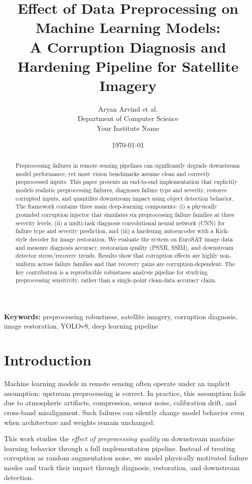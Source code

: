 \documentclass[11pt]{article}
\title{Effect of Data Preprocessing on Machine Learning Models:\\
A Corruption Diagnosis and Hardening Pipeline for Satellite Imagery}
\author{Aryan Arvind et al.\\
Department of Computer Science\\
Your Institute Name}
\date{\today}
\begin{document}
\maketitle

\begin{abstract}
Preprocessing failures in remote sensing pipelines can significantly degrade downstream model performance, yet most vision benchmarks assume clean and correctly preprocessed inputs. This paper presents an end-to-end implementation that explicitly models realistic preprocessing failures, diagnoses failure type and severity, restores corrupted inputs, and quantifies downstream impact using object detection behavior. The framework contains three main deep-learning components: (i) a physically grounded corruption injector that simulates six preprocessing failure families at three severity levels, (ii) a multi-task diagnosis convolutional neural network (CNN) for failure type and severity prediction, and (iii) a hardening autoencoder with a Kick-style decoder for image restoration. We evaluate the system on EuroSAT image data and measure diagnosis accuracy, restoration quality (PSNR, SSIM), and downstream detector stress/recovery trends. Results show that corruption effects are highly non-uniform across failure families and that recovery gains are corruption-dependent. The key contribution is a reproducible robustness analysis pipeline for studying preprocessing sensitivity, rather than a single-point clean-data accuracy claim.
\end{abstract}

\noindent\textbf{Keywords:} preprocessing robustness, satellite imagery, corruption diagnosis, image restoration, YOLOv8, deep learning pipeline

\section{Introduction}
Machine learning models in remote sensing often operate under an implicit assumption: upstream preprocessing is correct. In practice, this assumption fails due to atmospheric artifacts, compression, sensor noise, calibration drift, and cross-band misalignment. Such failures can silently change model behavior even when architecture and weights remain unchanged.

This work studies the \emph{effect of preprocessing quality} on downstream machine learning behavior through a full implementation pipeline. Instead of treating corruption as random augmentation noise, we model physically motivated failure modes and track their impact through diagnosis, restoration, and downstream detection.
\end{document}
